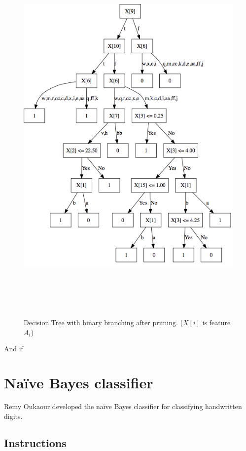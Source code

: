 \documentclass[11pt]{article}
\begin{document}
\begin{figure}[h!]
\centering
\includegraphics[height=7.62in, width=6.5in]{bin_after.png}
\caption{Decision Tree with binary branching after pruning. ($X[i]$ is feature $A_i$)}
\label{bin_after}
\end{figure}

And if 
\section{Na{\"i}ve Bayes classifier}

Remy Oukaour developed the na{\"i}ve Bayes classifier for classifying handwritten
digits.

\subsection{Instructions}
\end{document}
